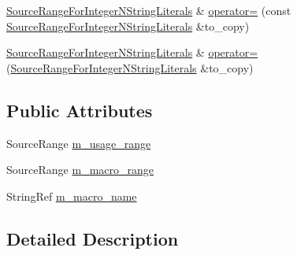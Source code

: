 \begin{DoxyCompactItemize}
\item 
\hyperlink{classclang_1_1tidy_1_1pagesjaunes_1_1_exec_s_q_l_l_o_b_read_to_function_call_1_1_source_range_for_integer_n_string_literals}{Source\+Range\+For\+Integer\+N\+String\+Literals} \& \hyperlink{classclang_1_1tidy_1_1pagesjaunes_1_1_exec_s_q_l_l_o_b_read_to_function_call_1_1_source_range_for_integer_n_string_literals_a1a83bda83cf3bc6061b7738e5ebc46a6}{operator=} (const \hyperlink{classclang_1_1tidy_1_1pagesjaunes_1_1_exec_s_q_l_l_o_b_read_to_function_call_1_1_source_range_for_integer_n_string_literals}{Source\+Range\+For\+Integer\+N\+String\+Literals} \&to\+\_\+copy)
\item 
\hyperlink{classclang_1_1tidy_1_1pagesjaunes_1_1_exec_s_q_l_l_o_b_read_to_function_call_1_1_source_range_for_integer_n_string_literals}{Source\+Range\+For\+Integer\+N\+String\+Literals} \& \hyperlink{classclang_1_1tidy_1_1pagesjaunes_1_1_exec_s_q_l_l_o_b_read_to_function_call_1_1_source_range_for_integer_n_string_literals_a68314e715efe3d19119dfffbc70c58c6}{operator=} (\hyperlink{classclang_1_1tidy_1_1pagesjaunes_1_1_exec_s_q_l_l_o_b_read_to_function_call_1_1_source_range_for_integer_n_string_literals}{Source\+Range\+For\+Integer\+N\+String\+Literals} \&to\+\_\+copy)
\end{DoxyCompactItemize}
\subsection*{Public Attributes}
\begin{DoxyCompactItemize}
\item 
Source\+Range \hyperlink{classclang_1_1tidy_1_1pagesjaunes_1_1_exec_s_q_l_l_o_b_read_to_function_call_1_1_source_range_for_integer_n_string_literals_a6dadf5ae1274ed352f5eae606be6dfe7}{m\+\_\+usage\+\_\+range}
\item 
Source\+Range \hyperlink{classclang_1_1tidy_1_1pagesjaunes_1_1_exec_s_q_l_l_o_b_read_to_function_call_1_1_source_range_for_integer_n_string_literals_ae188cfa19be6af2bb4747e3c8e06a681}{m\+\_\+macro\+\_\+range}
\item 
String\+Ref \hyperlink{classclang_1_1tidy_1_1pagesjaunes_1_1_exec_s_q_l_l_o_b_read_to_function_call_1_1_source_range_for_integer_n_string_literals_a53529aad3a644cc96cab339cdb889eab}{m\+\_\+macro\+\_\+name}
\end{DoxyCompactItemize}


\subsection{Detailed Description}


